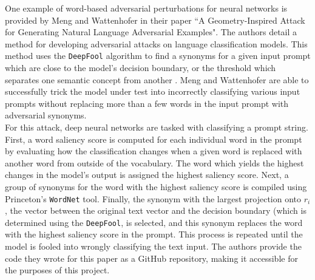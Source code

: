 \documentclass{article}
\begin{document}
One example of word-based adversarial perturbations for neural networks is provided by Meng and Wattenhofer in their paper ``A Geometry-Inspired Attack for Generating Natural Language Adversarial Examples". The authors detail a method for developing adversarial attacks on language classification models. This method uses the \texttt{DeepFool} algorithm to find a synonyms for a given input prompt which are close to the model's decision boundary, or the threshold which separates one semantic concept from another \citep{meng2020}. Meng and Wattenhofer are able to successfully trick the model under test into incorrectly classifying various input prompts without replacing more than a few words in the input prompt with adversarial synonyms. \\

For this attack, deep neural networks are tasked with classifying a prompt string. First, a word saliency score is computed for each individual word in the prompt by evaluating how the classification changes when a given word is replaced with another word from outside of the vocabulary. The word which yields the highest changes in the model's output is assigned the highest saliency score. Next, a group of synonyms for the word with the highest saliency score is compiled using Princeton's \texttt{WordNet} tool. Finally, the synonym with the largest projection onto $r_i$, the vector between the original text vector and the decision boundary (which is determined using the \texttt{DeepFool}, is selected, and this synonym replaces the word with the highest saliency score in the prompt. This process is repeated until the model is fooled into wrongly classifying the text input. The authors provide the code they wrote for this paper as a GitHub repository, making it accessible for the purposes of this project. 

\end{document}
